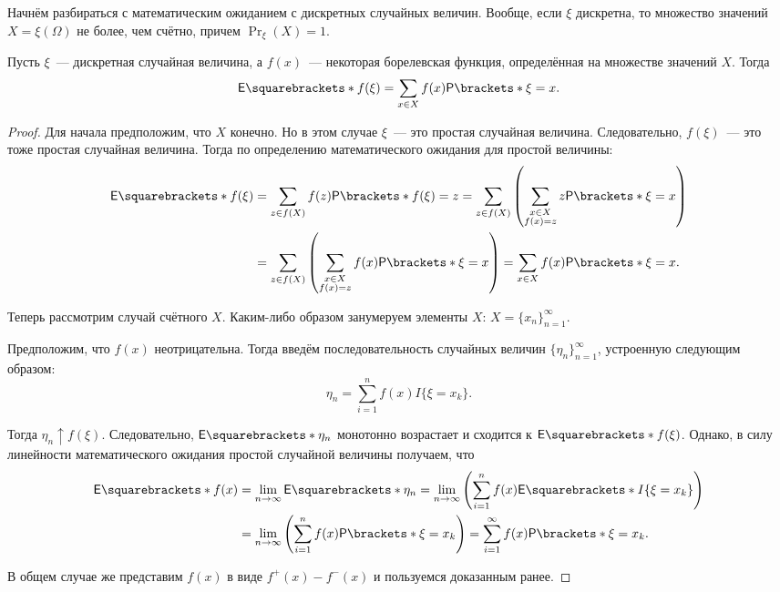 Начнём разбираться с математическим ожиданием с дискретных случайных величин. Вообще, если \(\xi\) дискретна, то множество значений \(X = \xi(\Omega)\) не более, чем счётно, причем \(\Pr_{\xi}(X) = 1\).
\begin{theorem}
	Пусть \(\xi\)~--- дискретная случайная величина, а \(f(x)\)~--- некоторая борелевская функция, определённая на множестве значений \(X\). Тогда
	\[
	\E{f(\xi)} = \sum\limits_{x \in X} f(x)\Pr{\xi = x}.
	\]
\end{theorem}
\begin{proof}
	Для начала предположим, что \(X\) конечно. Но в этом случае \(\xi\)~--- это простая случайная величина. Следовательно, \(f(\xi)\)~--- это тоже простая случайная величина. Тогда по определению математического ожидания для простой величины:
	\begin{align}
		\E{f(\xi)} &= \sum\limits_{z \in f(X)} f(z)\Pr{f(\xi) = z} = \sum\limits_{z \in f(X)}\left(\sum\limits_{\substack{x \in X \\ f(x) = z}} z\Pr{\xi = x}\right) \\
		&= \sum\limits_{z \in f(X)}\left(\sum\limits_{\substack{x \in X \\ f(x) = z}} f(x)\Pr{\xi = x}\right) = \sum\limits_{x \in X} f(x)\Pr{\xi = x}.
	\end{align}
	
	Теперь рассмотрим случай счётного \(X\). Каким-либо образом занумеруем элементы \(X\): \(X = \{x_n\}_{n = 1}^{\infty}\).
	
	Предположим, что \(f(x)\) неотрицательна. Тогда введём последовательность случайных величин \(\{\eta_n\}_{n = 1}^{\infty}\), устроенную следующим образом:
	\[
	\eta_n = \sum_{i = 1}^{n} f(x)I\{\xi = x_k\}.
	\]
	
	Тогда \(\eta_n \uparrow f(\xi)\). Следовательно, \(\E{\eta_n}\) монотонно возрастает и сходится к \(\E{f(\xi)}\). Однако, в силу линейности математического ожидания простой случайной величины получаем, что
	\begin{align}
		\E{f(x)} &= \lim\limits_{n \to \infty} \E{\eta_n} = \lim\limits_{n \to \infty} \left(\sum_{i = 1}^{n} f(x)\E{I\{\xi = x_k\}}\right) \\
		&= \lim\limits_{n \to \infty} \left(\sum_{i = 1}^{n} f(x)\Pr{\xi = x_k}\right) = \sum_{i = 1}^{\infty} f(x)\Pr{\xi = x_k}.
	\end{align}
	
	В общем случае же представим \(f(x)\) в виде \(f^{+}(x) - f^{-}(x)\) и пользуемся доказанным ранее.
\end{proof}

